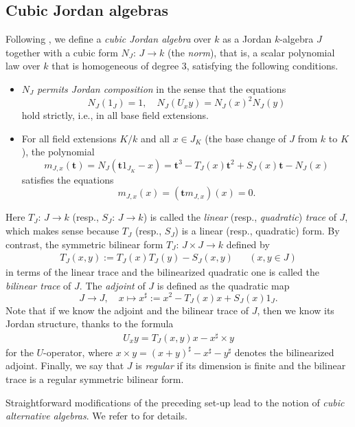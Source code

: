 \documentclass{amsart}
\theoremstyle{definition} %
\theoremstyle{remark} %
\newcommand{\bft}{\mathbf{t}}
\renewcommand{\:}{\colon\,}
\numberwithin{equation}{section}
\begin{document}
\subsection{Cubic Jordan algebras} \label{ss.CUBJOR} Following \cite[34.1]{MR4806163}, we define a \emph{cubic Jordan algebra} over $k$ as a Jordan $k$-algebra $J$ together with a cubic form $N_J\:J \to k$ (the \emph{norm}), that is, a scalar polynomial law over $k$ that is homogeneous of degree $3$, satisfying the following conditions.
\begin{itemize}
\item  [(a)] $N_J$ \emph{permits Jordan composition} in the sense that the equations
\[
N_J(1_J) = 1, \quad N_J(U_xy) = N_J(x)^2N_J(y)
\]
hold strictly, i.e., in all base field extensions.

\item [(b)] For all field extensions $K/k$ and all $x \in J_K$ (the base change of $J$ from $k$ to $K$), the polynomial
\[
m_{J,x}(\bft) = N_J(\bft 1_{J_K} - x) = \bft^3 - T_J(x)\bft^2 + S_J(x)\bft - N_J(x)
\] satisfies the equations
\[
m_{J,x}(x) = (\bft m_{J,x})(x) = 0.
\]
\end{itemize}
Here $T_J\:J \to k$ (resp., $S_J\:J \to k$) is called the \emph{linear} (resp., \emph{quadratic}) \emph{trace} of $J$, which makes sense because $T_J$ (resp., $S_J$) is a linear (resp., quadratic) form. By contrast, the symmetric bilinear form $T_J\:J \times J \to k$ defined by
\begin{align*}
T_J(x,y) := T_J(x)T_J(y) - S_J(x,y) &&(x,y \in J)
\end{align*}
in terms of the linear trace and the bilinearized quadratic one is called the \emph{bilinear trace} of $J$. The \emph{adjoint} of $J$ is defined as the quadratic map
\[
J \longrightarrow J, \quad x \longmapsto x^\sharp := x^2 - T_J(x)x + S_J(x)1_J. 
\]
Note that if we know the adjoint and the bilinear trace of $J$, then we know its Jordan structure, thanks to the formula
\begin{align}
\label{UOPCUB} U_xy = T_J(x,y)x - x^\sharp \times y
\end{align}
for the $U$-operator, where $x \times y = (x + y)^\sharp - x^\sharp - y^\sharp$ denotes the bilinearized adjoint. Finally, we say that $J$ is \emph{regular} if its dimension is finite and the bilinear trace is a regular symmetric bilinear form.

Straightforward modifications of the preceding set-up lead to the notion of \emph{cubic alternative algebras}. We refer to \cite[34.11]{MR4806163} for details.
\end{document}
